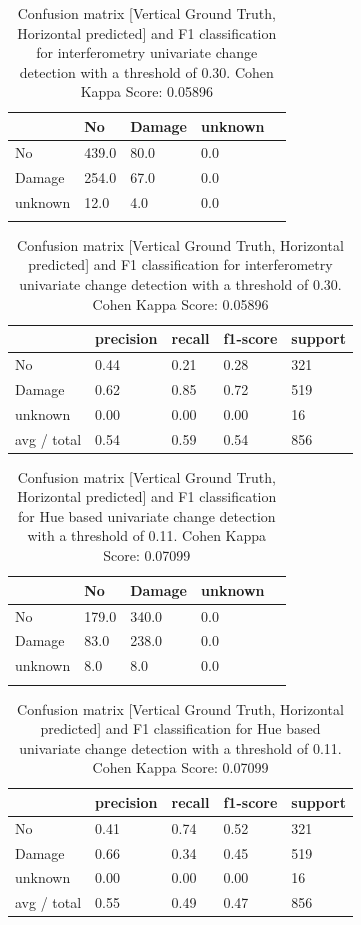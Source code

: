 \begin{table} [H]
	\footnotesize
	\captionsetup{justification=raggedright,singlelinecheck=false}
	\caption{Confusion matrix [Vertical Ground Truth, Horizontal predicted] and F1 classification for interferometry univariate change detection with a threshold of 0.30. Cohen Kappa Score: 0.05896}
	\begin{tabular}{l|llll}
		& No    & Damage & unknown &  \\ \hline
		No      & 439.0 & 80.0   & 0.0     &  \\
		Damage  & 254.0 & 67.0   & 0.0     &  \\
		unknown & 12.0  & 4.0    & 0.0     &  \\
		&       &        &         & 
	\end{tabular}
	\begin{tabular}{l|llll}
		& precision & recall & f1-score & support \\ \hline
		No          & 0.44      & 0.21   & 0.28     & 321     \\
		Damage      & 0.62      & 0.85   & 0.72     & 519     \\
		unknown     & 0.00      & 0.00   & 0.00     & 16      \\
		avg / total & 0.54      & 0.59   & 0.54     & 856    
	\end{tabular}

	\label{tab:matInt}
\end{table} 

\begin{table} [H]
	\footnotesize
	\captionsetup{justification=raggedright,singlelinecheck=false}
	\caption{Confusion matrix [Vertical Ground Truth, Horizontal predicted] and F1 classification for Hue based univariate change detection with a threshold of 0.11. Cohen Kappa Score: 0.07099}
	\begin{tabular}{l|llll}
		& No    & Damage & unknown &  \\ \hline
		No      & 179.0 & 340.0  & 0.0     &  \\
		Damage  & 83.0  & 238.0  & 0.0     &  \\
		unknown & 8.0   & 8.0    & 0.0     &  \\
		&       &        &         & 
	\end{tabular}
	\begin{tabular}{l|llll}
		& precision & recall & f1-score & support \\ \hline
		No          & 0.41      & 0.74   & 0.52     & 321     \\
		Damage      & 0.66      & 0.34   & 0.45     & 519     \\
		unknown     & 0.00      & 0.00   & 0.00     & 16      \\
		avg / total & 0.55      & 0.49   & 0.47     & 856    
	\end{tabular}
	\label{tab:matH}
\end{table}


